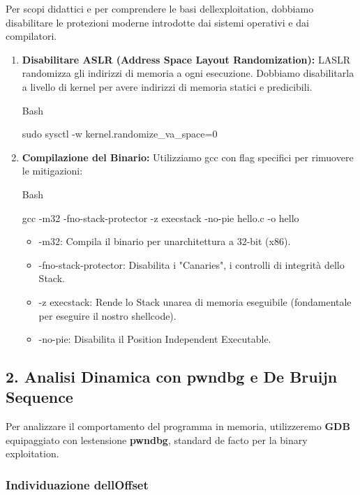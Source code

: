 \documentclass[11pt,a4paper]{article}
\begin{document}
Per scopi didattici e per comprendere le basi
dell\textquotesingle exploitation, dobbiamo disabilitare le protezioni
moderne introdotte dai sistemi operativi e dai compilatori.

\begin{enumerate}
\def\labelenumi{\arabic{enumi}.}
\item
  \textbf{Disabilitare ASLR (Address Space Layout Randomization):}
  L\textquotesingle ASLR randomizza gli indirizzi di memoria a ogni
  esecuzione. Dobbiamo disabilitarla a livello di kernel per avere
  indirizzi di memoria statici e predicibili.

  Bash

  sudo sysctl -w kernel.randomize\_va\_space=0
\item
  \textbf{Compilazione del Binario:} Utilizziamo gcc con flag specifici
  per rimuovere le mitigazioni:

  Bash

  gcc -m32 -fno-stack-protector -z execstack -no-pie hello.c -o hello

  \begin{itemize}
  \item
    -m32: Compila il binario per un\textquotesingle architettura a
    32-bit (x86).
  \item
    -fno-stack-protector: Disabilita i "Canaries", i controlli di
    integrità dello Stack.
  \item
    -z execstack: Rende lo Stack un\textquotesingle area di memoria
    eseguibile (fondamentale per eseguire il nostro shellcode).
  \item
    -no-pie: Disabilita il Position Independent Executable.
  \end{itemize}
\end{enumerate}

\subsection{2. Analisi Dinamica con pwndbg e De Bruijn
Sequence}\label{analisi-dinamica-con-pwndbg-e-de-bruijn-sequence}

Per analizzare il comportamento del programma in memoria, utilizzeremo
\textbf{GDB} equipaggiato con l\textquotesingle estensione
\textbf{pwndbg}, standard de facto per la binary exploitation.

\subsubsection{Individuazione
dell\textquotesingle Offset}\label{individuazione-delloffset}
\end{document}
